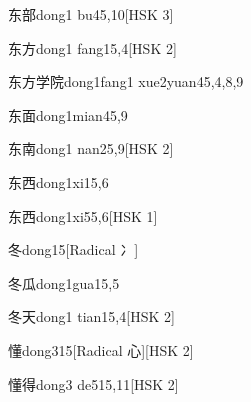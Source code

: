\begin{entry}{东部}{dong1 bu4}{5,10}[HSK 3]
\end{entry}

\begin{entry}{东方}{dong1 fang1}{5,4}[HSK 2]
\end{entry}

\begin{entry}{东方学院}{dong1fang1 xue2yuan4}{5,4,8,9}
\end{entry}

\begin{entry}{东面}{dong1mian4}{5,9}
\end{entry}

\begin{entry}{东南}{dong1 nan2}{5,9}[HSK 2]
\end{entry}

\begin{entry}{东西}{dong1xi1}{5,6}
\end{entry}

\begin{entry}{东西}{dong1xi5}{5,6}[HSK 1]
\end{entry}

\begin{entry}{冬}{dong1}{5}[Radical 冫]
\end{entry}

\begin{entry}{冬瓜}{dong1gua1}{5,5}
\end{entry}

\begin{entry}{冬天}{dong1 tian1}{5,4}[HSK 2]
\end{entry}

\begin{entry}{懂}{dong3}{15}[Radical 心][HSK 2]
\end{entry}

\begin{entry}{懂得}{dong3 de5}{15,11}[HSK 2]
\end{entry}

